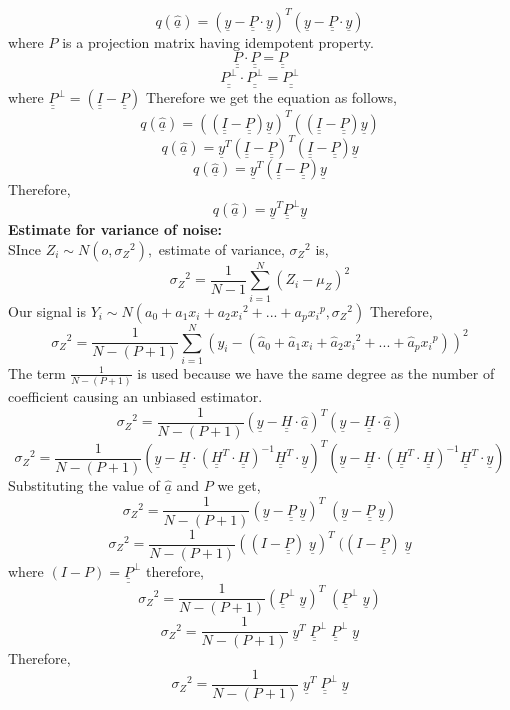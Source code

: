 $$q(\underline{\hat{a}}) = (\underline{y} - \underline{\underline{P}}\cdot \underline{y})^T(\underline{y} - \underline{\underline{P}}\cdot \underline{y})$$
\noindent where $P$ is a projection matrix having idempotent property.
$$\underline{\underline{P}}\cdot\underline{\underline{P}} = \underline{\underline{P}}$$
$$\underline{\underline{P^\bot}}\cdot\underline{\underline{P^\bot}} = \underline{\underline{P^\bot}}$$
\noindent where $\underline{\underline{P}}^\bot = (\underline{\underline{I}}-\underline{\underline{P}})$
\noindent Therefore we get the equation as follows,
$$q(\hat{\underline{a}}) = ( (\underline{\underline{I}} - \underline{\underline{P}})\underline{y})^T( (\underline{\underline{I}}-\underline{\underline{P}})\underline{y}) $$ 
$$q(\hat{\underline{a}}) = \underline{y}^T(\underline{\underline{I}} -\underline{\underline{P}})^T(\underline{\underline{I}}-\underline{\underline{P}})\underline{y}$$
$$q(\hat{\underline{a}}) = \underline{y}^T(\underline{\underline{I}}-\underline{\underline{P}})\underline{y}$$
\noindent Therefore,
$$q(\hat{\underline{a}}) = \underline{y}^T\underline{\underline{P}}^\bot \underline{y}$$
\newpage
\noindent \textbf{Estimate for variance of noise:}\\
\noindent SInce $Z_i \sim N(o, {\sigma_Z}^2),$ estimate of variance, ${\sigma_Z}^2$ is,
$$ {\sigma_Z}^2 = \frac{1}{N-1} \sum_{i=1}^{N}(Z_i - \mu_Z)^2  $$
\noindent Our signal is  $Y_i \sim N( a_0 + a_1 x_i + a_2 {x_i}^2 + ...+ a_p {x_i}^p, {\sigma_Z}^2) $
\noindent Therefore, 
$$ {\sigma_Z}^2 = \frac{1}{N-(P+1)} \sum_{i=1}^{N}(y_i - ( \hat{a}_0 + \hat{a}_1 x_i + \hat{a}_2 {x_i}^2 + ...+ \hat{a}_p {x_i}^p))^2 $$
\noindent The term $ \frac{1}{N-(P+1)}  $ is used because we have the same degree as the number of coefficient causing an unbiased estimator.
$$ {\sigma_Z}^2 = \frac{1}{N-(P+1)}(\underline{y} - \underline{\underline{H}} \cdot \underline{\hat{a}})^T (\underline{y} - \underline{\underline{H}} \cdot \underline{\hat{a}}) $$
$$ {\sigma_Z}^2 = \frac{1}{N-(P+1)}(\underline{y}-\underline{\underline{H}} \cdot (\underline{\underline{H}}^T \cdot \underline{\underline{H}})^{-1}\underline{\underline{H}}^T \cdot \underline{y})^T(\underline{y} -\underline{\underline{H}} \cdot (\underline{\underline{H}}^T\cdot \underline{\underline{H}})^{-1}\underline{\underline{H}}^T\cdot \underline{y}) $$
\noindent Substituting the value of $\underline{\hat{a}}$ and $P$ we get,
$$ {\sigma_Z}^2 = \frac{1}{N-(P+1)}(\underline{y} - \underline{\underline{P}} \;\underline{y})^T \; (\underline{y} - \underline{\underline{P}} \; \underline{y}) $$
$$ {\sigma_Z}^2 = \frac{1}{N-(P+1)}((I - \underline{\underline{P}}) \;\underline{y})^T \; ((I - \underline{\underline{P}}) \; \underline{y} $$
\noindent where $ (I - P) = \underline{\underline{P}}^\bot $ therefore,
$$ {\sigma_Z}^2 = \frac{1}{N-(P+1)}( \underline{\underline{P}}^\bot \;\underline{y})^T \; (\underline{\underline{P}}^\bot \; \underline{y}) $$
$$ {\sigma_Z}^2 = \frac{1}{N-(P+1)} \; \underline{y}^T \; \underline{\underline{P}}^\bot \; \underline{\underline{P}}^\bot \; \underline{y} $$
\noindent Therefore,
$$ {\sigma_Z}^2 = \frac{1}{N-(P+1)} \; \underline{y}^T \; \underline{\underline{P}}^\bot  \; \underline{y} $$

